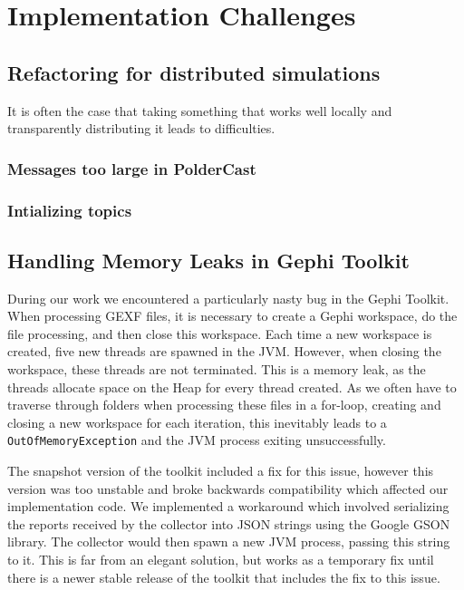 \section{Implementation Challenges}

\subsection{Refactoring for distributed simulations}
It is often the case that taking something that works well
locally and transparently distributing it leads to difficulties.

\subsubsection{Messages too large in PolderCast}
\subsubsection{Intializing topics}

\subsection{Handling Memory Leaks in Gephi Toolkit}
During our work we encountered a particularly nasty bug in the Gephi
Toolkit. When processing GEXF files, it is necessary to create a Gephi
workspace, do the file processing, and then close this workspace. Each
time a new workspace is created, five new threads are spawned in the
JVM\@. However, when closing the workspace, these threads are not
terminated. This is a memory leak, as the threads allocate space on the
Heap for every thread created. As we often have to traverse through
folders when processing these files in a for-loop, creating and closing
a new workspace for each iteration, this inevitably leads to a
\texttt{OutOfMemoryException} and the JVM process exiting
unsuccessfully.

The snapshot version of the toolkit included a fix for this issue,
however this version was too unstable and broke backwards compatibility
which affected our implementation code. We implemented a workaround
which involved serializing the reports received by the collector into
JSON strings using the Google GSON~\cite{gson} library. The collector
would then spawn a new JVM process, passing this string to it.  This is
far from an elegant solution, but works as a temporary fix until there
is a newer stable release of the toolkit that includes the fix to this
issue.


